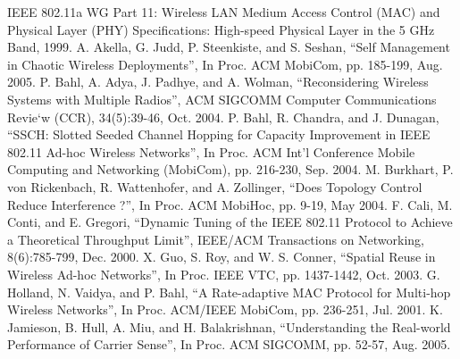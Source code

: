 \documentclass[12pt,a4paper]{article}
\begin{document}
\newpage
\begin{thebibliography}{00}

 IEEE 802.11a WG Part 11: Wireless LAN Medium Access Control (MAC) and Physical Layer (PHY) Specifications: High-speed Physical Layer in the 5 GHz Band, 1999.
 A. Akella, G. Judd, P. Steenkiste, and S. Seshan, “Self Management in Chaotic Wireless Deployments”, In Proc. ACM MobiCom, pp. 185-199, Aug. 2005.
 P. Bahl, A. Adya, J. Padhye, and A. Wolman, “Reconsidering Wireless Systems with Multiple Radios”, ACM SIGCOMM Computer Communications Revie`w (CCR), 34(5):39-46, Oct. 2004.
 P. Bahl, R. Chandra, and J. Dunagan, “SSCH: Slotted Seeded Channel Hopping for Capacity Improvement in IEEE 802.11 Ad-hoc Wireless Networks”, In Proc. ACM Int’l Conference Mobile Computing and Networking (MobiCom), pp. 216-230, Sep. 2004.
 M. Burkhart, P. von Rickenbach, R. Wattenhofer, and A. Zollinger, “Does Topology Control Reduce Interference ?”, In Proc. ACM MobiHoc, pp. 9-19, May 2004.
 F. Cali, M. Conti, and E. Gregori, “Dynamic Tuning of the IEEE 802.11 Protocol to Achieve a Theoretical Throughput Limit”, IEEE/ACM Transactions on Networking, 8(6):785-799, Dec. 2000.
 X. Guo, S. Roy, and W. S. Conner, “Spatial Reuse in Wireless Ad-hoc Networks”, In Proc. IEEE VTC, pp. 1437-1442, Oct. 2003.
 G. Holland, N. Vaidya, and P. Bahl, “A Rate-adaptive MAC Protocol for Multi-hop Wireless Networks”, In Proc. ACM/IEEE MobiCom, pp. 236-251, Jul. 2001.
 K. Jamieson, B. Hull, A. Miu, and H. Balakrishnan, “Understanding the Real-world Performance of Carrier Sense”, In Proc. ACM SIGCOMM, pp. 52-57, Aug. 2005.


\end{thebibliography}
\end{document}

